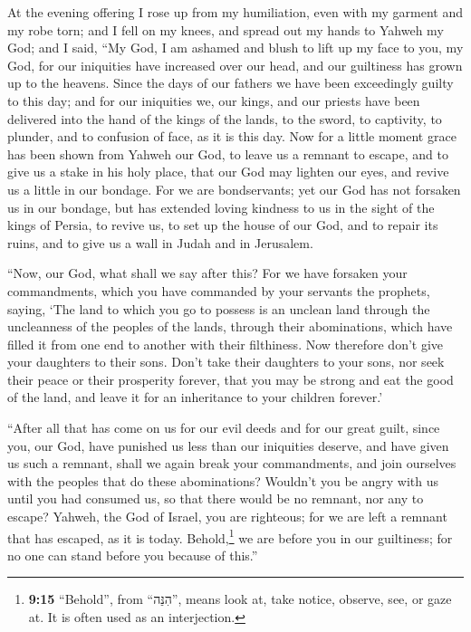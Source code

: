  At the evening offering I rose up from my humiliation,
even with my garment and my robe torn; and I fell on my knees, and
spread out my hands to Yahweh my God;  and I said, ``My
God, I am ashamed and blush to lift up my face to you, my God, for our
iniquities have increased over our head, and our guiltiness has grown up
to the heavens.  Since the days of our fathers we have
been exceedingly guilty to this day; and for our iniquities we, our
kings, and our priests have been delivered into the hand of the kings of
the lands, to the sword, to captivity, to plunder, and to confusion of
face, as it is this day.  Now for a little moment grace
has been shown from Yahweh our God, to leave us a remnant to escape, and
to give us a stake in his holy place, that our God may lighten our eyes,
and revive us a little in our bondage.  For we are
bondservants; yet our God has not forsaken us in our bondage, but has
extended loving kindness to us in the sight of the kings of Persia, to
revive us, to set up the house of our God, and to repair its ruins, and
to give us a wall in Judah and in Jerusalem.

 ``Now, our God, what shall we say after this? For we
have forsaken your commandments,  which you have
commanded by your servants the prophets, saying, `The land to which you
go to possess is an unclean land through the uncleanness of the peoples
of the lands, through their abominations, which have filled it from one
end to another with their filthiness.  Now therefore
don't give your daughters to their sons. Don't take their daughters to
your sons, nor seek their peace or their prosperity forever, that you
may be strong and eat the good of the land, and leave it for an
inheritance to your children forever.'

 ``After all that has come on us for our evil deeds and
for our great guilt, since you, our God, have punished us less than our
iniquities deserve, and have given us such a remnant, 
shall we again break your commandments, and join ourselves with the
peoples that do these abominations? Wouldn't you be angry with us until
you had consumed us, so that there would be no remnant, nor any to
escape?  Yahweh, the God of Israel, you are righteous;
for we are left a remnant that has escaped, as it is today.
Behold,\footnote{\textbf{9:15} ``Behold'', from ``הִנֵּה'', means look
  at, take notice, observe, see, or gaze at. It is often used as an
  interjection.} we are before you in our guiltiness; for no one can
stand before you because of this.''

